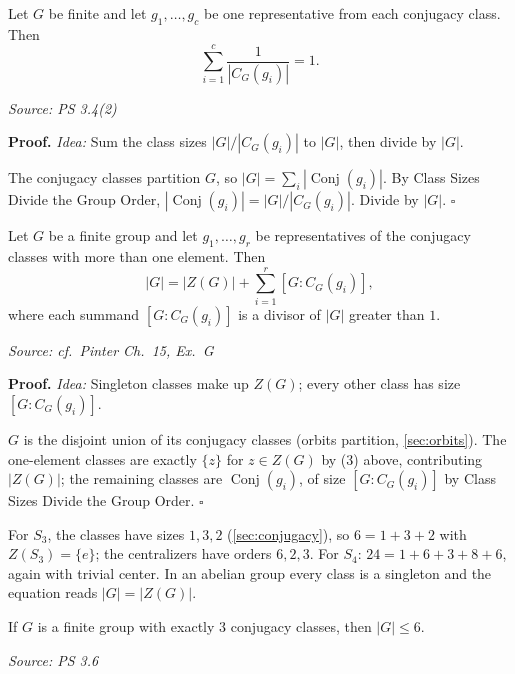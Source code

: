 \documentclass[11pt]{report}
\renewenvironment{proof}[1][Proof]{\noindent\textbf{#1.} }{\hfill$\square$\par\vspace{5pt}}
\newcommand{\srcline}[1]{\par\hfill{\footnotesize\textit{Source: #1}}}
\begin{document}
\begin{corbox}\label{cor:class-equation-reciprocal-form}
Let $G$ be finite and let $g_1, \ldots, g_c$ be one representative from each conjugacy class. Then
\[ \sum_{i=1}^{c} \frac{1}{|C_G(g_i)|} = 1. \]
\srcline{PS 3.4(2)}
\end{corbox}

\begin{proof}
\textit{Idea:} Sum the class sizes $|G|/|C_G(g_i)|$ to $|G|$, then divide by $|G|$.\par
The conjugacy classes partition $G$, so $|G| = \sum_i |\operatorname{Conj}(g_i)|$. By Class Sizes Divide the Group Order, $|\operatorname{Conj}(g_i)| = |G|/|C_G(g_i)|$. Divide by $|G|$.
\end{proof}

\begin{thmbox}\label{thm:class-equation}
Let $G$ be a finite group and let $g_1, \ldots, g_r$ be representatives of the conjugacy classes with more than one element. Then
\[ |G| = |Z(G)| + \sum_{i=1}^{r} [G : C_G(g_i)], \]
where each summand $[G : C_G(g_i)]$ is a divisor of $|G|$ greater than $1$.
\srcline{cf.\ Pinter Ch.\ 15, Ex.\ G}
\end{thmbox}

\begin{proof}
\textit{Idea:} Singleton classes make up $Z(G)$; every other class has size $[G : C_G(g_i)]$.\par
$G$ is the disjoint union of its conjugacy classes (orbits partition, \ref{sec:orbits}). The one-element classes are exactly $\{z\}$ for $z \in Z(G)$ by (3) above, contributing $|Z(G)|$; the remaining classes are $\operatorname{Conj}(g_i)$, of size $[G : C_G(g_i)]$ by Class Sizes Divide the Group Order.
\end{proof}

\begin{exbox}\label{ex:class-equations-s3-s4}
For $S_3$, the classes have sizes $1, 3, 2$ (\ref{sec:conjugacy}), so $6 = 1 + 3 + 2$ with $Z(S_3) = \{e\}$; the centralizers have orders $6, 2, 3$. For $S_4$: $24 = 1 + 6 + 3 + 8 + 6$, again with trivial center. In an abelian group every class is a singleton and the equation reads $|G| = |Z(G)|$.
\end{exbox}

\begin{propbox}\label{prop:three-conjugacy-classes-force-order-at-most-6}
If $G$ is a finite group with exactly $3$ conjugacy classes, then $|G| \leq 6$.
\srcline{PS 3.6}
\end{propbox}
\end{document}
